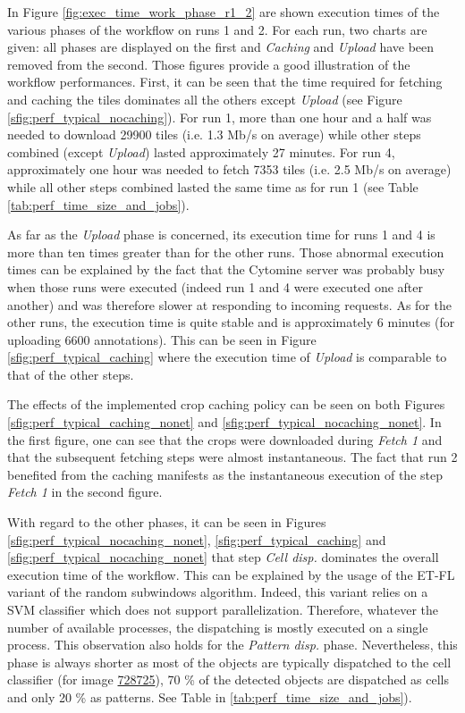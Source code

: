 In Figure \ref{fig:exec_time_work_phase_r1_2} are shown execution times of the various phases of the workflow on runs 1 and 2. For each run, two charts are given: all phases are displayed on the first and \textit{Caching} and \textit{Upload} have been removed from the second. Those figures provide a good illustration of the workflow performances. First, it can be seen that the time required for fetching and caching the tiles dominates all the others except \textit{Upload} (see Figure \ref{sfig:perf_typical_nocaching}). For run 1, more than one hour and a half was needed to download 29900 tiles (i.e. 1.3 Mb/s on average) while other steps combined (except \textit{Upload}) lasted approximately 27 minutes. For run 4, approximately one hour was needed to fetch 7353 tiles (i.e. 2.5 Mb/s on average) while all other steps combined lasted the same time as for run 1 (see Table \ref{tab:perf_time_size_and_jobs}). 

As far as the \textit{Upload} phase is concerned, its execution time for runs 1 and 4 is more than ten times greater than for the other runs. Those abnormal execution times can be explained by the fact that the Cytomine server was probably busy when those runs were executed (indeed run 1 and 4 were executed one after another) and was therefore slower at responding to incoming requests. As for the other runs, the execution time is quite stable and is approximately 6 minutes (for uploading 6600 annotations). This can be seen in Figure \ref{sfig:perf_typical_caching} where the execution time of \textit{Upload} is comparable to that of the other steps.  

The effects of the implemented crop caching policy can be seen on both Figures \ref{sfig:perf_typical_caching_nonet} and \ref{sfig:perf_typical_nocaching_nonet}. In the first figure, one can see that the crops were downloaded during \textit{Fetch 1} and that the subsequent fetching steps were almost instantaneous. The fact that run 2 benefited from the caching manifests as the instantaneous execution of the step \textit{Fetch 1} in the second figure.

With regard to the other phases, it can be seen in Figures \ref{sfig:perf_typical_nocaching_nonet}, \ref{sfig:perf_typical_caching} and \ref{sfig:perf_typical_nocaching_nonet} that step \textit{Cell disp.} dominates the overall execution time of the workflow. This can be explained by the usage of the ET-FL variant of the random subwindows algorithm. Indeed, this variant relies on a SVM classifier which does not support parallelization. Therefore, whatever the number of available processes, the dispatching is mostly executed on a single process. This observation also holds for the \textit{Pattern disp.} phase. Nevertheless, this phase is always shorter as most of the objects are typically dispatched to the cell classifier (for image \href{http://beta.cytomine.be/#tabs-image-716498-728725-}{728725}), 70 \% of the detected objects are dispatched as cells and only 20 \% as patterns. See Table in \ref{tab:perf_time_size_and_jobs}). 

